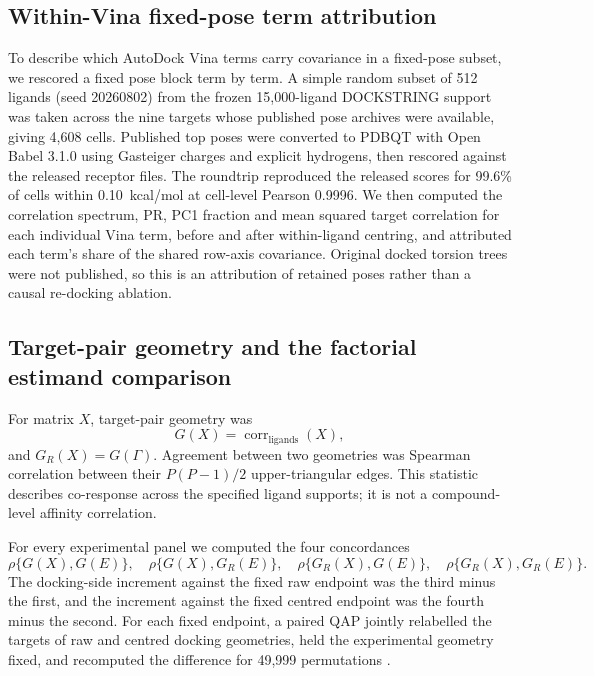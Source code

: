 \documentclass[11pt]{article}
\begin{document}
\subsection{Within-Vina fixed-pose term attribution}

To describe which AutoDock Vina terms carry covariance in a fixed-pose subset, we rescored a
fixed pose block term by term. A simple random subset of 512
ligands (seed 20260802) from the frozen 15,000-ligand DOCKSTRING support was taken across
the nine targets whose published pose archives were available, giving 4,608 cells. Published
top poses were converted to PDBQT with Open Babel 3.1.0 using Gasteiger charges and explicit
hydrogens, then rescored against the released receptor files. The roundtrip reproduced the
released scores for 99.6\% of cells within 0.10~kcal/mol at cell-level Pearson 0.9996. We
then computed the correlation spectrum, PR, PC1 fraction and mean squared target correlation
for each individual Vina term, before and after within-ligand centring, and attributed each
term's share of the shared row-axis covariance. Original docked torsion trees were not
published, so this is an attribution of retained poses rather than a causal re-docking
ablation.

\subsection{Target-pair geometry and the factorial estimand comparison}

For matrix $X$, target-pair geometry was
\begin{equation}
G(X)=\operatorname{corr}_{\mathrm{ligands}}(X),
\end{equation}
and $G_R(X)=G(\Gamma)$. Agreement between two geometries was Spearman correlation between
their $P(P-1)/2$ upper-triangular edges. This statistic describes co-response across the
specified ligand supports; it is not a compound-level affinity correlation.

For every experimental panel we computed the four concordances
\begin{equation}
\rho\{G(X),G(E)\},\quad \rho\{G(X),G_R(E)\},\quad
\rho\{G_R(X),G(E)\},\quad \rho\{G_R(X),G_R(E)\}.
\end{equation}
The docking-side increment against the fixed raw endpoint was the third minus the first,
and the increment against the fixed centred endpoint was the fourth minus the second. For
each fixed endpoint, a paired QAP jointly relabelled the targets of raw and centred docking
geometries, held the experimental geometry fixed, and recomputed the difference for 49,999
permutations \cite{hubert1976,dekker2007}.
\end{document}

